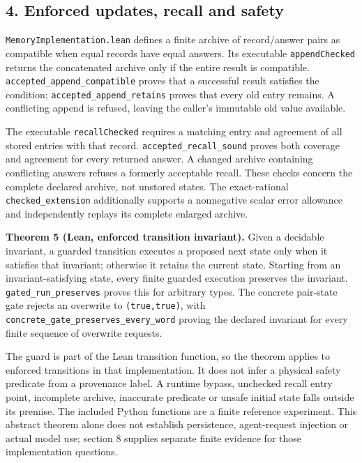 \documentclass[
  10pt,
]{article}
\begin{document}
\subsection{4. Enforced updates, recall and safety}\label{enforced-updates-recall-and-safety}

\texttt{MemoryImplementation.lean} defines a finite archive of record/answer pairs as compatible when equal records have equal answers. Its executable \texttt{appendChecked} returns the concatenated archive only if the entire result is compatible. \texttt{accepted\_append\_compatible} proves that a successful result satisfies the condition; \texttt{accepted\_append\_retains} proves that every old entry remains. A conflicting append is refused, leaving the caller's immutable old value available.

The executable \texttt{recallChecked} requires a matching entry and agreement of all stored entries with that record. \texttt{accepted\_recall\_sound} proves both coverage and agreement for every returned answer. A changed archive containing conflicting answers refuses a formerly acceptable recall. These checks concern the complete declared archive, not unstored states. The exact-rational \texttt{checked\_extension} additionally supports a nonnegative scalar error allowance and independently replays its complete enlarged archive.

\textbf{Theorem 5 (Lean, enforced transition invariant).} Given a decidable invariant, a guarded transition executes a proposed next state only when it satisfies that invariant; otherwise it retains the current state. Starting from an invariant-satisfying state, every finite guarded execution preserves the invariant. \texttt{gated\_run\_preserves} proves this for arbitrary types. The concrete pair-state gate rejects an overwrite to \texttt{(true,true)}, with \texttt{concrete\_gate\_preserves\_every\_word} proving the declared invariant for every finite sequence of overwrite requests.

The guard is part of the Lean transition function, so the theorem applies to enforced transitions in that implementation. It does not infer a physical safety predicate from a provenance label. A runtime bypass, unchecked recall entry point, incomplete archive, inaccurate predicate or unsafe initial state falls outside its premise. The included Python functions are a finite reference experiment. This abstract theorem alone does not establish persistence, agent-request injection or actual model use; section 8 supplies separate finite evidence for those implementation questions.
\end{document}
